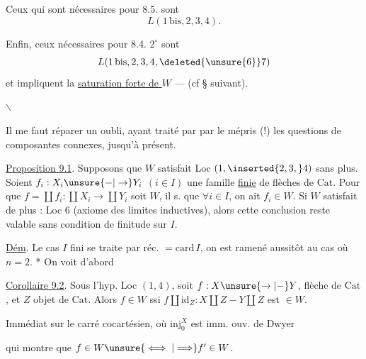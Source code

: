 Ceux qui sont nécessaires pour 8.5.    sont 
\[
 L(1\,\mathrm{bis},2,3,4).
\]

Enfin, ceux nécessaires pour 8.4. $2^\circ$ sont
\[
 L(1\,\mathrm{bis},2,3,4,\deleted{\unsure{6}}7)
\]
et  impliquent la \uline{saturation forte de $W$} --- (cf \S{} suivant).

$\backslash$

Il me faut réparer un oubli, ayant traité  par par le mépris (!) les questions de composantes connexes, jusqu'à présent.

\uline{Proposition 9.1}. Supposons que $W$ satisfait Loc $(1,\inserted{2,3,}4)$ sans plus.  Soient $f_i:X_i\unsure{-|\to}Y_i$ $(i\in I)$ une famille \uline{finie} de flèches de $\mathrm{Cat}$. Pour que $f=\coprod f_i:\coprod X_i\to\coprod Y_i$ soit  $W$, il  s. que $\forall i\in I$, on ait $f_i\in W$. Si $W$ satisfait de plus : Loc 6 (axiome des limites inductives), alors cette conclusion reste valable sans condition de finitude sur $I$.

\uline{Dém}. Le cas $I$ fini se traite par réc. $=\mathrm{card}\,I$, on est ramené aussitôt au cas où $n=2$. * On voit d'abord 


\uline{Corollaire 9.2}.  Sous l'hyp. Loc $(1,4)$, soit $f:X\unsure{\to|-}Y$,  flèche de $\mathrm{Cat}$, et $Z$ objet de $\mathrm{Cat}$. Alors $f\in W$ ssi $f\amalg\mathrm{id}_Z:X\amalg Z-Y\amalg Z$ est $\in W$.

Immédiat sur le carré cocartésien, où  $\mathrm{inj}_0^X$ est imm. ouv. de Dwyer


qui montre que $f\in W\unsure{\iff|\Longrightarrow} f'\in W$.

